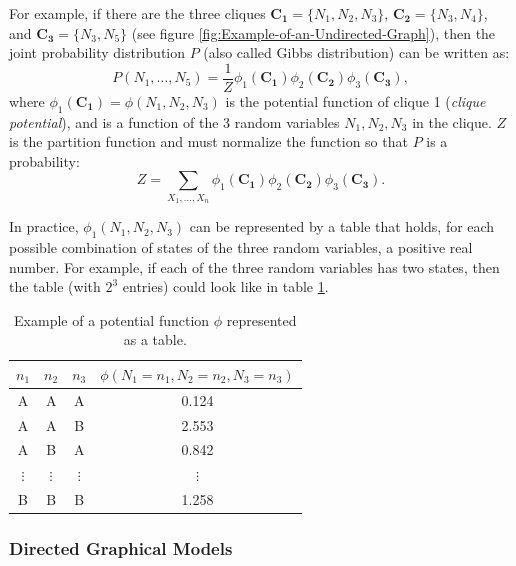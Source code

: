 For example, if there are the three cliques $\mathbf{C_{1}}=\{N_{1},N_{2},N_{3}\}$,
$\mathbf{C_{2}}=\{N_{3},N_{4}\}$, and $\mathbf{C_{3}}=\{N_{3},N_{5}\}$
(see figure \ref{fig:Example-of-an-Undirected-Graph}), then the joint
probability distribution $P$ (also called Gibbs
distribution) can be written as: 
\[
P(N_{1},\dots,N_{5})=\frac{1}{Z}\phi_{1}(\mathbf{C_{1}})\phi_{2}(\mathbf{C_{2}})\phi_{3}(\mathbf{C_{3}}),
\]
where $\phi_{1}(\mathbf{C_{1}})=\phi(N_{1},N_{2},N_{3})$ is the potential
function of clique 1 (\emph{clique potential}),
and is a function of the 3 random variables $N_{1},N_{2},N_{3}$ in
the clique. $Z$ is the partition function and must normalize the
function so that $P$ is a probability: 
\[
Z=\sum_{X_{1},\dots,X_{n}}\phi_{1}(\mathbf{C_{1}})\phi_{2}(\mathbf{C_{2}})\phi_{3}(\mathbf{C_{3}}).
\]

In practice, $\phi_{1}(N_{1},N_{2},N_{3})$ can be represented by
a table that holds, for each possible combination of states of the
three random variables, a positive real number. For example, if each
of the three random variables has two states, then the table (with
$2^{3}$ entries) could look like in table \ref{tab:Example-of-potential-function}.

\begin{center}
\begin{table}
\begin{centering}
\begin{tabular}{|c|c|c||c|}
\hline 
$n_{1}$ & $n_{2}$ & $n_{3}$ & $\phi(N_{1}=n_{1},N_{2}=n_{2},N_{3}=n_{3})$\tabularnewline
\hline 
\hline 
A & A & A & 0.124\tabularnewline
\hline 
A & A & B & 2.553\tabularnewline
\hline 
A & B & A & 0.842\tabularnewline
\hline 
$\vdots$ & $\vdots$ & $\vdots$ & $\vdots$\tabularnewline
\hline 
B & B & B & 1.258\tabularnewline
\hline 
\end{tabular}
\par\end{centering}
\caption{\label{tab:Example-of-potential-function}Example of a potential function
$\phi$ represented as a table.}
\end{table}
\par\end{center}

\subsubsection{Directed Graphical Models}


